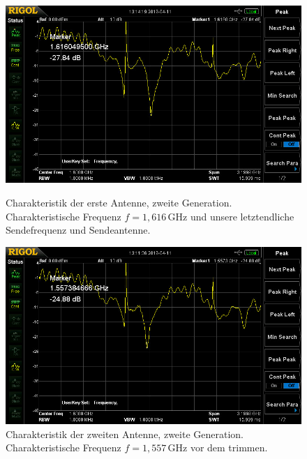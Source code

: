 \documentclass[titlepage,11pt,a4paper,ngerman]{article}
\begin{document}
\begin{figure}[ht]
	\includegraphics[scale=0.075]{Bilder/ant12.jpg}
	\centering
	\caption{Charakteristik der erste Antenne, zweite Generation. Charakteristische Frequenz $f=1{,}616\,$GHz und unsere letztendliche Sendefrequenz und Sendeantenne.}
	\label{Ant1}
	\vspace{50pt}
%
	\includegraphics[scale=0.075]{Bilder/ant22.jpg}
	\centering
	\caption{Charakteristik der zweiten Antenne, zweite Generation. Charakteristische Frequenz $f=1{,}557\,$GHz vor dem trimmen.}
	\label{Ant2}
\end{figure}

\end{document}
